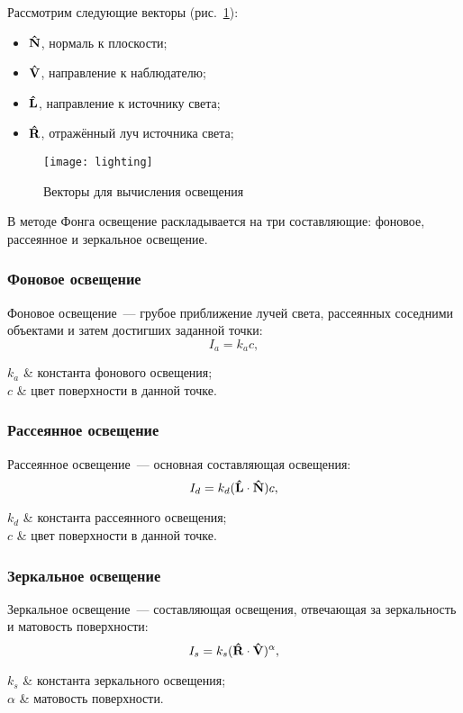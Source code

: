 Рассмотрим следующие векторы (рис.~\ref{fig:lighting}):
\begin{itemize}
  \item $\boldsymbol{\mathbf{\hat{N}}}$, нормаль к плоскости;
  \item $\boldsymbol{\mathbf{\hat{V}}}$, направление к наблюдателю;
  \item $\boldsymbol{\mathbf{\hat{L}}}$, направление к источнику света;
  \item $\boldsymbol{\mathbf{\hat{R}}}$, отражённый луч источника света;
\end{itemize}

\begin{figure}[h]
  \centering
  \texttt{[image: lighting]}
  \caption{Векторы для вычисления освещения}
  \label{fig:lighting}
\end{figure}

В методе Фонга освещение раскладывается на три составляющие: фоновое, рассеянное и зеркальное освещение.

\subsubsection{Фоновое освещение}
Фоновое освещение~--- грубое приближение лучей света, рассеянных соседними объектами и затем достигших заданной точки:
\begin{equation} \label{eq:ambient}
  I_a=k_ac,
\end{equation}
\begin{conditions}
  $k_a$ & константа фонового освещения;\\
  $c$ & цвет поверхности в данной точке.
\end{conditions}

\subsubsection{Рассеянное освещение}
Рассеянное освещение~--- основная составляющая освещения:
\begin{equation} \label{eq:diffuse}
  I_d=k_d(\boldsymbol{\mathbf{\hat{L}}}\cdot\boldsymbol{\mathbf{\hat{N}}})c,
\end{equation}
\begin{conditions}
  $k_d$ & константа рассеянного освещения;\\
  $c$ & цвет поверхности в данной точке.
\end{conditions}

\subsubsection{Зеркальное освещение}
Зеркальное освещение~--- составляющая освещения, отвечающая за зеркальность и матовость поверхности:
\begin{equation} \label{eq:specular}
  I_s=k_s(\boldsymbol{\mathbf{\hat{R}}}\cdot\boldsymbol{\mathbf{\hat{V}}})^\alpha,
\end{equation}
\begin{conditions}
  $k_s$ & константа зеркального освещения;\\
  $\alpha$ & матовость поверхности.
\end{conditions}

